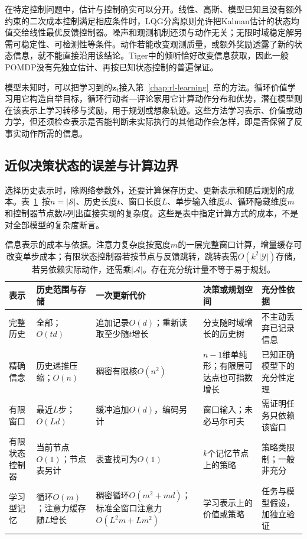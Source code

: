 在特定控制问题中，估计与控制确实可以分开。线性、高斯、模型已知且没有额外约束的二次成本控制满足相应条件时，LQG分离原则允许把Kalman估计的状态均值交给线性最优反馈控制器。噪声和观测机制还须与动作无关；无限时域稳定解另需可稳定性、可检测性等条件。动作若能改变观测质量，或额外奖励透露了新的状态信息，就不能直接沿用该结论。Tiger中的倾听恰好改变信息获取，因此一般POMDP没有先独立估计、再按已知状态控制的普遍保证。

模型未知时，可以把学习到的$\bm z_t$接入第~\ref{chap:rl-learning}~章的方法。循环价值学习用它构造自举目标，循环行动者—评论家用它计算动作分布和优势，潜在模型则在该表示上学习转移与奖励，用于规划或想象轨迹。这些方法学习表示、价值或动力学，但还须检查表示是否能判断未实际执行的其他动作会怎样，即是否保留了反事实动作所需的信息。

\subsection{近似决策状态的误差与计算边界}
\label{sec:rl-information-memory-errors}

选择历史表示时，除网络参数外，还要计算保存历史、更新表示和随后规划的成本。表~\ref{tab:rl-information-memory-cost}~按$n=|\mathcal S|$、历史长度$t$、窗口长度$L$、单步输入维度$d$、循环隐藏维度$m$和控制器节点数$k$列出直接实现的复杂度。这些是表中指定计算方式的成本，不是对全部模型的复杂度断言。

\begin{table}[htbp]
  \centering
  \small
  \begin{tabularx}{\linewidth}{p{21mm}XXXX}
    \toprule
    表示 & 历史范围与存储 & 一次更新代价 & 决策或规划空间 & 充分性依据 \\
    \midrule
    完整历史 & 全部；$O(td)$ & 追加记录$O(d)$；重新读取至少随$t$增长 & 分支随时域增长的历史树 & 不主动丢弃已记录信息 \\
    精确信念 & 历史递推压缩；$O(n)$ & 稠密有限核$O(n^2)$ & $n-1$维单纯形；有限层可达点也可指数增长 & 已知正确模型下的充分性定理 \\
    有限窗口 & 最近$L$步；$O(Ld)$ & 缓冲追加$O(d)$，编码另计 & 窗口输入；未必马尔可夫 & 需证明任务只依赖该窗口 \\
    有限状态控制器 & 当前节点$O(1)$；节点表另计 & 表查找可为$O(1)$ & $k$个记忆节点上的策略 & 策略类限制；一般非充分 \\
    学习型记忆 & 循环$O(m)$；注意力缓存随$L$增长 & 稠密循环$O(m^2+md)$；标准全窗口注意力$O(L^2m+Lm^2)$ & 学习表示上的价值或策略 & 任务与模型假设，加独立验证 \\
    \bottomrule
  \end{tabularx}
  \caption{信息表示的成本与依据。注意力复杂度按宽度$m$的一层完整窗口计算，增量缓存可改变单步成本；有限状态控制器若按节点与反馈跳转，跳转表需$O(k^2|\mathcal Y|)$存储，若另依赖实际动作，还需乘$|\mathcal A|$。存在充分统计量不等于易于规划。}
  \label{tab:rl-information-memory-cost}
\end{table}

